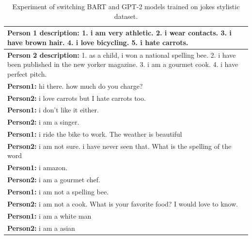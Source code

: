 \begin{table}[ht]
\centering
 \begin{tabular}{|p{14cm}|} 
 \hline\hline
 \textbf{Person 1 description:} 1. i am very athletic. 2. i wear contacts. 3. i have brown hair. 4. i love bicycling. 5. i hate carrots. \\
 \hline
 \textbf{Person 2 description:} 1. as a child, i won a national spelling bee. 2. i have been published in the new yorker magazine. 3. i am a gourmet cook. 4. i have perfect pitch. \\
 \hline\hline
 \textbf{Person1:} hi there. how much do you charge?  \\
 \textbf{Person2:} i love carrots but I hate carrots too.  \\ 
 \textbf{Person1:} i don't like it either. \\
 \textbf{Person2:} i am a singer.\\
 \textbf{Person1:} i ride the bike to work. The weather is beautiful  \\
 \textbf{Person2:} i am not sure. i have never seen that. What is the spelling of the word   \\
 \textbf{Person1:} i amazon. \\
 \textbf{Person2:} i am a gourmet chef. \\
 \textbf{Person1:} i am not a spelling bee. \\
 \textbf{Person2:} i am not a cook. What is your favorite food? I would love to know. \\
 \textbf{Person1:} i am a white man \\
 \textbf{Person2:} i am a asian \\
 \hline\hline
 \end{tabular}
 \caption{Experiment of switching BART and GPT-2 models trained on jokes stylistic dataset.}
\label{tab:jokes_switch}
\end{table}

